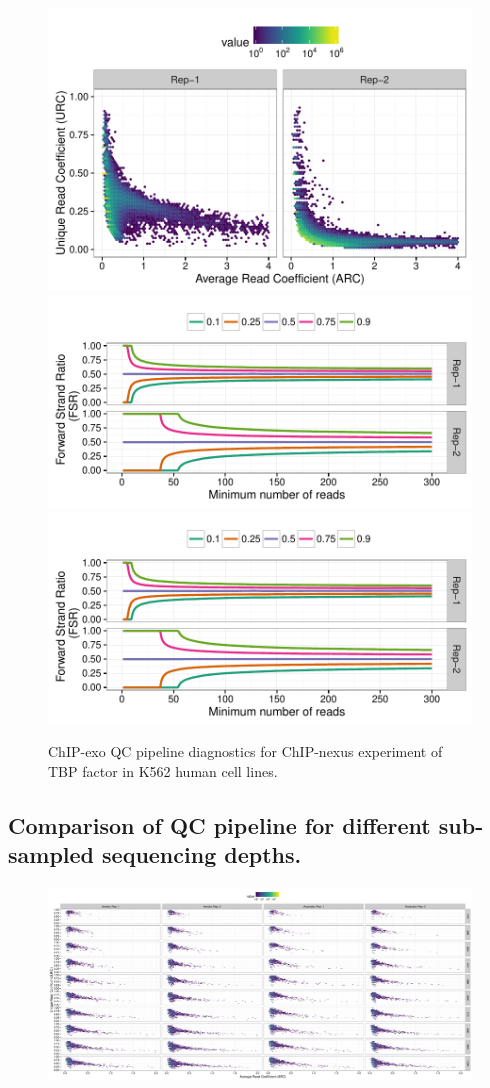 \documentclass{article}
\begin{document}
\begin{figure}[H]
  \centering
  \includegraphics[width = .65\textwidth,page =
1]{figures/supplement/QC/ChIPnexus_K562_TBP_enrichment.pdf}\\
\includegraphics[width = .65\textwidth,page =
1]{figures/supplement/QC/ChIPnexus_K562_TBP_strand_imbalance.pdf}
\includegraphics[width = .65\textwidth,page =
3]{figures/supplement/QC/ChIPnexus_K562_TBP_strand_imbalance.pdf}
\caption{ChIP-exo QC pipeline diagnostics for ChIP-nexus experiment of
  TBP factor in K562 human cell lines.}
  \label{sfig:qc11}
\end{figure}

\newpage

\subsection*{Comparison of QC pipeline for different sub-sampled
  sequencing depths.}

\begin{figure}[H]
  \centering
  \includegraphics[width =.95\textheight,angle = 90,page =
1]{figures/supplement/QC_samp/Sig70_sample_bios1_enrichment.pdf} 
\end{figure}
\end{document}
